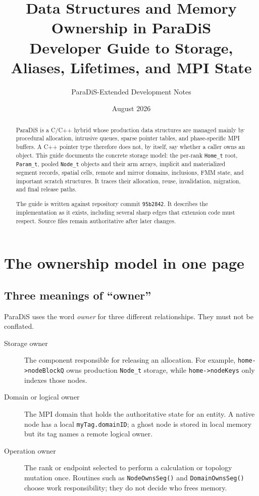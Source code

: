 \documentclass[11pt]{article}
\title{Data Structures and Memory Ownership in ParaDiS\\
       \large Developer Guide to Storage, Aliases, Lifetimes, and MPI State}
\author{ParaDiS-Extended Development Notes}
\date{August 2026}
\newcommand{\code}[1]{\texorpdfstring{\nolinkurl{#1}}{#1}}
\begin{document}
\maketitle

\begin{abstract}
ParaDiS is a C/C++ hybrid whose production data structures are managed mainly
by procedural allocation, intrusive queues, sparse pointer tables, and
phase-specific MPI buffers.  A C++ pointer type therefore does not, by itself,
say whether a caller owns an object.  This guide documents the concrete
storage model: the per-rank \code{Home_t} root, \code{Param_t}, pooled
\code{Node_t} objects and their arm arrays, implicit and materialized segment
records, spatial cells, remote and mirror domains, inclusions, FMM state, and
important scratch structures.  It traces their allocation, reuse,
invalidation, migration, and final release paths.

The guide is written against repository commit \code{95b2842}.  It describes
the implementation as it exists, including several sharp edges that extension
code must respect.  Source files remain authoritative after later changes.
\end{abstract}

\tableofcontents
\newpage

\section{The ownership model in one page}

\subsection{Three meanings of ``owner''}

ParaDiS uses the word \emph{owner} for three different relationships.  They
must not be conflated.

\begin{description}
\item[Storage owner]
The component responsible for releasing an allocation.  For example,
\code{home->nodeBlockQ} owns production \code{Node_t} storage, while
\code{home->nodeKeys} only indexes those nodes.

\item[Domain or logical owner]
The MPI domain that holds the authoritative state for an entity.  A native
node has a local \code{myTag.domainID}; a ghost node is stored in local memory
but its tag names a remote logical owner.

\item[Operation owner]
The rank or endpoint selected to perform a calculation or topology mutation
once.  Routines such as \code{NodeOwnsSeg()} and \code{DomainOwnsSeg()} choose
work responsibility; they do not decide who frees memory.
\end{description}
\end{document}
